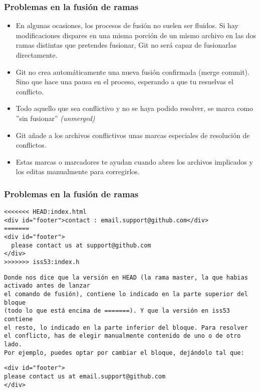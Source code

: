 \documentclass{beamer}
\begin{document}
\begin{frame}
\frametitle{Problemas en la fusión de ramas}
\begin{itemize}[<+->]
\item En algunas ocasiones, los procesos de fusión no suelen ser fluidos. Si hay modificaciones dispares en una misma porción de un mismo archivo en las dos ramas distintas que pretendes fusionar, Git no será capaz de fusionarlas directamente. 
\item Git no crea automáticamente una nueva fusión confirmada (merge commit). Sino que hace una pausa en el proceso, esperando a que tu resuelvas el conflicto. 
\item Todo aquello que sea conflictivo y no se haya podido resolver, se marca como ''sin fusionar'' \emph{(unmerged)}
\item Git añade a los archivos conflictivos unas marcas especiales de resolución de conflictos. 
\item Estas marcas o marcadores te ayudan cuando abres los archivos implicados y los editas manualmente para corregirlos. 
\end{itemize}
\end{frame}

\begin{frame}[fragile]
\frametitle{Problemas en la fusión de ramas}

\begin{verbatim}
<<<<<<< HEAD:index.html
<div id="footer">contact : email.support@github.com</div>
=======
<div id="footer">
  please contact us at support@github.com
</div>
>>>>>>> iss53:index.h
\end{verbatim}
\pause
\begin{tiny}

\begin{verbatim}
Donde nos dice que la versión en HEAD (la rama master, la que habias activado antes de lanzar
el comando de fusión), contiene lo indicado en la parte superior del bloque 
(todo lo que está encima de =======). Y que la versión en iss53 contiene
el resto, lo indicado en la parte inferior del bloque. Para resolver
el conflicto, has de elegir manualmente contenido de uno o de otro lado.
Por ejemplo, puedes optar por cambiar el bloque, dejándolo tal que:
\end{verbatim}

\end{tiny}
\pause
\begin{verbatim}
<div id="footer">
please contact us at email.support@github.com
</div>

\end{verbatim}

\end{frame}
\end{document}
